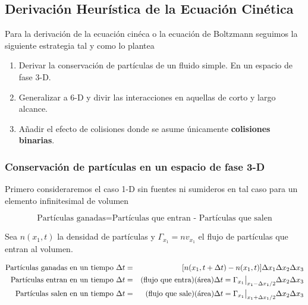 \subsection{Derivaci\'on Heur\'istica de la Ecuaci\'on Cin\'etica}

Para la derivaci\'on de la ecuaci\'on cin\'eca o la ecuaci\'on de Boltzmann seguimos la siguiente estrategia tal y como lo plantea \cite{freidberg2014}

\begin{enumerate}
  \item Derivar la conservaci\'on de part\'iculas de un fluido simple. En un espacio de fase 3-D.
  \item Generalizar a 6-D y divir las interacciones en aquellas de corto y largo alcance.
  \item A\~nadir el efecto de colisiones donde se asume \'unicamente \textbf{colisiones binarias}.
\end{enumerate} 

\subsubsection{Conservaci\'on de part\'iculas en un espacio de fase 3-D}

Primero consideraremos el caso 1-D sin fuentes ni sumideros en tal caso para un elemento infinitesimal de volumen 

\begin{equation*}
\text{Part\'iculas ganadas} = \text{Part\'iculas que entran - Part\'iculas que salen}
\end{equation*}

Sea $n(x_1, t)$ la densidad de part\'iculas y $\Gamma_{x_1} = nv_{x_1}$ el flujo de part\'iculas que entran al volumen.  

\begin{eqnarray}
  \text{Part\'iculas ganadas en un tiempo }  \Delta t &=& [n(x_1, t + \Delta t) - n(x_1,t)]\Delta x_1\Delta x_2\Delta x_3 \nonumber \\
  \text{Part\'iculas entran en un tiempo } \Delta t &=& (\text{flujo que entra})(\text{\'area})\Delta t = \Gamma_{x_1}\big{|}_{x_1 - \Delta x_1/2} \Delta x_2\Delta x_3 \nonumber\\
  \text{Part\'iculas salen en un tiempo } \Delta t &=& (\text{flujo que sale})(\text{\'area})\Delta t = \Gamma_{x_1}\big{|}_{x_1 + \Delta x_1/2}\Delta x_2\Delta x_3 \nonumber\\
\end{eqnarray}

